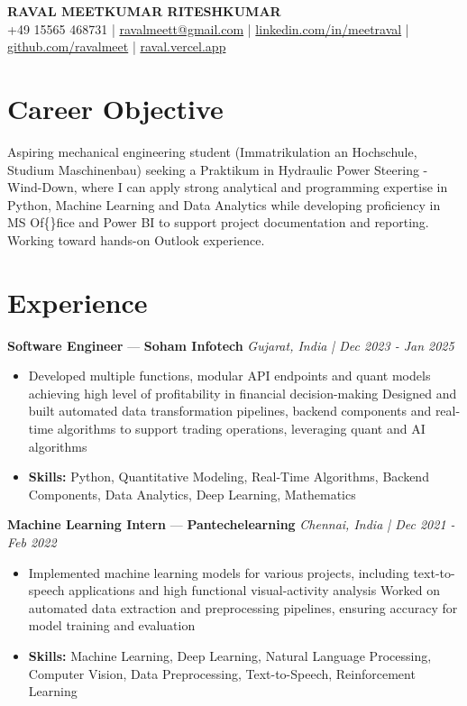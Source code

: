 \documentclass[a4paper,10pt]{article}
\begin{document}
\begin{center}
  {\Large\bfseries RAVAL MEETKUMAR RITESHKUMAR}\\[2pt]
  {\small +49 15565 468731 \;|\; \href{mailto:ravalmeett@gmail.com}{ravalmeett@gmail.com} \;|\; \href{https://www.linkedin.com/in/meetraval/}{linkedin.com/in/meetraval} \;|\; \href{https://github.com/ravalmeet}{github.com/ravalmeet} \;|\; \href{https://raval.vercel.app/}{raval.vercel.app}}
\end{center}
\vspace{-3pt}

\section*{Career Objective}
Aspiring mechanical engineering student (Immatrikulation an Hochschule, Studium Maschinenbau) seeking a Praktikum in Hydraulic Power Steering - Wind-Down, where I can apply strong analytical and programming expertise in Python, Machine Learning and Data Analytics while developing proficiency in MS Of\{\}fice and Power BI to support project documentation and reporting. Working toward hands-on Outlook experience.\par

\section*{Experience}
\textbf{Software Engineer} — \textbf{Soham Infotech} \hfill \textit{Gujarat, India \;|\; Dec 2023 - Jan 2025}\par
\vspace{1pt}
\begin{itemize}
  \item Developed multiple functions, modular API endpoints and quant models achieving high level of profitability in financial decision-making Designed and built automated data transformation pipelines, backend components and real-time algorithms to support trading operations, leveraging quant and AI algorithms
  \item \textbf{Skills:} Python, Quantitative Modeling, Real-Time Algorithms, Backend Components, Data Analytics, Deep Learning, Mathematics
\end{itemize}
\vspace{3pt}
\textbf{Machine Learning Intern} — \textbf{Pantechelearning} \hfill \textit{Chennai, India \;|\; Dec 2021 - Feb 2022}\par
\vspace{1pt}
\begin{itemize}
  \item Implemented machine learning models for various projects, including text-to-speech applications and high functional visual-activity analysis Worked on automated data extraction and preprocessing pipelines, ensuring accuracy for model training and evaluation
  \item \textbf{Skills:} Machine Learning, Deep Learning, Natural Language Processing, Computer Vision, Data Preprocessing, Text-to-Speech, Reinforcement Learning
\end{itemize}
\end{document}
